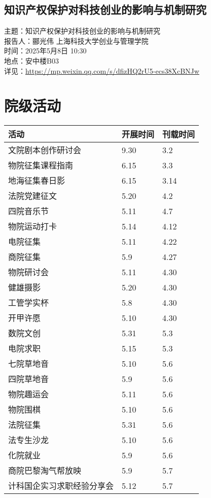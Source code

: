 \documentclass[letterpaper, 12pt]{article}
\begin{document}
\begin{multicols}{2}
\subsection{知识产权保护对科技创业的影响与机制研究} %
主题：知识产权保护对科技创业的影响与机制研究
\\报告人：郦光伟 上海科技大学创业与管理学院
\\时间：2025年5月8日 10:30
\\地点：安中楼B03 
\\详见：\url{https://mp.weixin.qq.com/s/dfizHQ2rU5-ecs38XcBNJw}


\section{院级活动}
\begin{tabular}{|>{\centering\arraybackslash}m{}|m{}|m{}|}
\hline
    活动 & 开展时间 & 刊载时间\\
    \hline\hline
    文院剧本创作研讨会 & 9.30 & 3.2\\
    物院征集课程指南 & 6.15 & 3.3\\
    地海征集春日影 & 6.15 & 3.14\\
    法院党建征文 & 5.20 & 4.2\\
    四院音乐节 & 5.11 & 4.7\\
    物院运动打卡 & 5.14 & 4.12\\
    电院征集 & 5.11 & 4.22\\
    商院征集 & 5.9 & 4.27\\
    物院研讨会 & 5.11 & 4.30\\
    健雄摄影 & 5.20 & 4.30\\
    工管学实杯 & 5.8 & 4.30\\
    开甲许愿 & 5.10 & 4.30\\
    数院文创 & 5.31 & 5.3\\
    电院求职 & 5.15 & 5.3\\
    七院草地音 & 5.10 & 5.6\\
    四院草地音 & 5.9 & 5.6\\
    物院趣运会 & 5.11 & 5.6\\
    物院围棋 & 5.10 & 5.6\\
    法院征集 & 5.31 & 5.6\\
    法专生沙龙 & 5.10 & 5.6\\
    化院就业 & 5.9 & 5.6\\
    商院巴黎淘气帮放映 & 5.9 & 5.7\\
    计科国企实习求职经验分享会 & 5.12 & 5.7\\
    \hline
\end{tabular}


\end{multicols}
\end{document}
